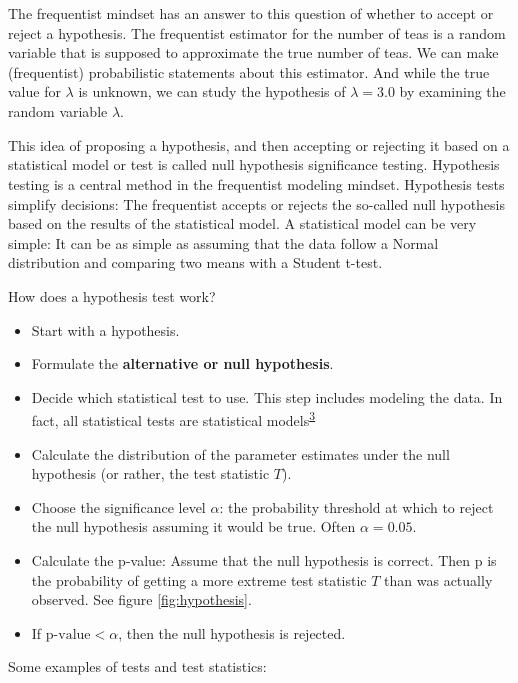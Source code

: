 \documentclass[
  10pt,
]{scrbook}
\providecommand{\tightlist}{%
  \setlength{\itemsep}{0pt}\setlength{\parskip}{0pt}}
\begin{document}
The frequentist mindset has an answer to this question of whether to accept or reject a hypothesis.
The frequentist estimator for the number of teas is a random variable that is supposed to approximate the true number of teas.
We can make (frequentist) probabilistic statements about this estimator.
And while the true value for \(\lambda\) is unknown, we can study the hypothesis of \(\lambda = 3.0\) by examining the random variable \(\hat{\lambda}\).

This idea of proposing a hypothesis, and then accepting or rejecting it based on a statistical model or test is called null hypothesis significance testing.
Hypothesis testing is a central method in the frequentist modeling mindset.
Hypothesis tests simplify decisions:
The frequentist accepts or rejects the so-called null hypothesis based on the results of the statistical model.
A statistical model can be very simple:
It can be as simple as assuming that the data follow a Normal distribution and comparing two means with a Student t-test.

How does a hypothesis test work?

\begin{itemize}
\tightlist
\item
  Start with a hypothesis.
\item
  Formulate the \textbf{alternative or null hypothesis}.
\item
  Decide which statistical test to use. This step includes modeling the data. In fact, all statistical tests are statistical models\textsuperscript{\protect\hyperlink{ref-mcelreath2020statistical}{3}}
\item
  Calculate the distribution of the parameter estimates under the null hypothesis (or rather, the test statistic \(T\)).
\item
  Choose the significance level \(\alpha\): the probability threshold at which to reject the null hypothesis assuming it would be true. Often \(\alpha = 0.05\).
\item
  Calculate the p-value: Assume that the null hypothesis is correct. Then p is the probability of getting a more extreme test statistic \(T\) than was actually observed. See figure \ref{fig:hypothesis}.
\item
  If \(\text{p-value} <\alpha\), then the null hypothesis is rejected.
\end{itemize}

Some examples of tests and test statistics:
\end{document}
